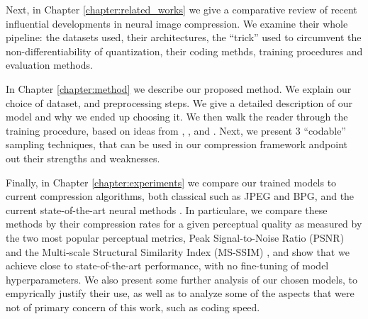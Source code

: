 \par
Next, in Chapter \ref{chapter:related_works} we give a comparative review of recent
influential developments in neural image compression. We examine their whole
pipeline: the datasets used, their architectures, the ``trick'' used to
circumvent the non-differentiability of quantization, their coding methds,
training procedures and evaluation methods.

\par
In Chapter \ref{chapter:method} we describe our proposed method. We explain our
choice of dataset, and preprocessing steps. We give a detailed description of
our model and why we ended up choosing it. We then walk the reader through the
training procedure, based on ideas from \cite{sonderby2016train},
\cite{higgins2017beta}, \cite{balle2018variational} and \cite{dai2019diagnosing}.
Next, we present 3 ``codable'' sampling techniques, that can be used in our
compression framework andpoint out their strengths and weaknesses.

\par
Finally, in Chapter \ref{chapter:experiments} we compare our trained models to
current compression algorithms, both classical such as JPEG and BPG, and
the current state-of-the-art neural methods \cite{balle2018variational}. In
particulare, we compare these methods by their compression rates for a given
perceptual quality as measured by the two most popular perceptual metrics, Peak
Signal-to-Noise Ratio (PSNR) \cite{psnr} and the Multi-scale Structural
Similarity Index (MS-SSIM) \cite{msssim}, and show that we achieve close to
state-of-the-art performance, with no fine-tuning of model hyperparameters.
We also present some further analysis of our chosen models, to empyrically
justify their use, as well as to analyze some of the aspects that were not of
primary concern of this work, such as coding speed.
\paragraph{}

